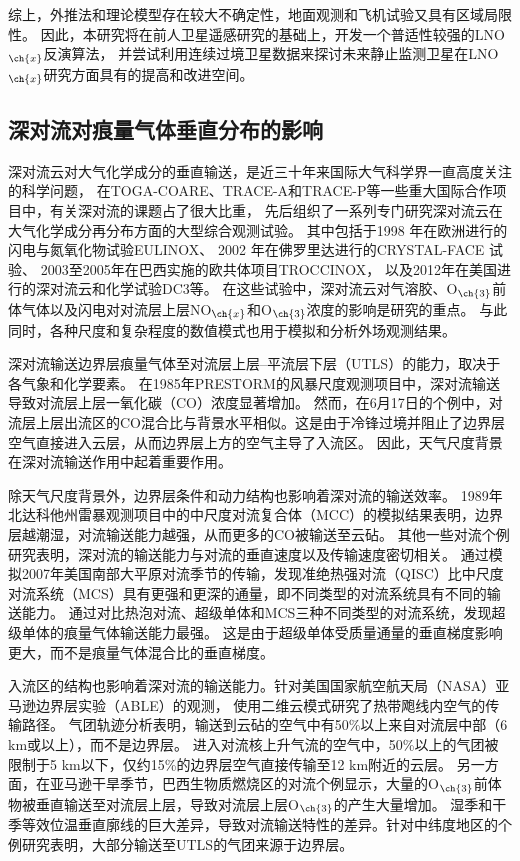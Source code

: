 综上，外推法和理论模型存在较大不确定性，地面观测和飞机试验又具有区域局限性。
因此，本研究将在前人卫星遥感研究的基础上，开发一个普适性较强的LNO$_{\ch{x}}$反演算法，
并尝试利用连续过境卫星数据来探讨未来静止监测卫星在LNO$_{\ch{x}}$研究方面具有的提高和改进空间。

\subsection{深对流对痕量气体垂直分布的影响}

深对流云对大气化学成分的垂直输送，是近三十年来国际大气科学界一直高度关注的科学问题，
在TOGA-COARE\citep{Webster.1992}、TRACE-A\citep{Fishman.1996}和TRACE-P\citep{Jacob.2003}等一些重大国际合作项目中，有关深对流的课题占了很大比重，
先后组织了一系列专门研究深对流云在大气化学成分再分布方面的大型综合观测试验。
其中包括于1998 年在欧洲进行的闪电与氮氧化物试验EULINOX\citep{Holler.2000}、
2002 年在佛罗里达进行的CRYSTAL-FACE 试验\citep{Toon.2003}、
2003至2005年在巴西实施的欧共体项目TROCCINOX\citep{Huntrieser.2008}，
以及2012年在美国进行的深对流云和化学试验DC3\citep{Barth.2019}等。
在这些试验中，深对流云对气溶胶、O$_{\ch{3}}$前体气体以及闪电对对流层上层NO$_{\ch{x}}$和O$_{\ch{3}}$浓度的影响是研究的重点。
与此同时，各种尺度和复杂程度的数值模式也用于模拟和分析外场观测结果。

深对流输送边界层痕量气体至对流层上层--平流层下层（UTLS）的能力，取决于各气象和化学要素。
在1985年PRESTORM的风暴尺度观测项目中，深对流输送导致对流层上层一氧化碳（CO）浓度显著增加\citep{Dickerson.1987,Pickering.1989}。
然而，在6月17日的个例中，对流层上层出流区的CO混合比与背景水平相似。这是由于冷锋过境并阻止了边界层空气直接进入云层，从而边界层上方的空气主导了入流区\citep{Pickering.1988}。
因此，天气尺度背景在深对流输送作用中起着重要作用。

除天气尺度背景外，边界层条件和动力结构也影响着深对流的输送效率。
1989年北达科他州雷暴观测项目中的中尺度对流复合体（MCC）的模拟结果表明，边界层越潮湿，对流输送能力越强，从而更多的CO被输送至云砧\citep{Stenchikov.1996}。
其他一些对流个例研究表明，深对流的输送能力与对流的垂直速度以及传输速度密切相关\citep{Pickering.1992a,Wang.1996}。
\citet{Bigelbach.2014}通过模拟2007年美国南部大平原对流季节的传输，发现准绝热强对流（QISC）比中尺度对流系统（MCS）具有更强和更深的通量，即不同类型的对流系统具有不同的输送能力。
\citet{Li.2017b}通过对比热泡对流、超级单体和MCS三种不同类型的对流系统，发现超级单体的痕量气体输送能力最强。
这是由于超级单体受质量通量的垂直梯度影响更大，而不是痕量气体混合比的垂直梯度。

入流区的结构也影响着深对流的输送能力。针对美国国家航空航天局（NASA）亚马逊边界层实验（ABLE）的观测，
\citet{Scala.1990}使用二维云模式研究了热带飑线内空气的传输路径。
气团轨迹分析表明，输送到云砧的空气中有50\%以上来自对流层中部（6 km或以上），而不是边界层。
进入对流核上升气流的空气中，50\%以上的气团被限制于5 km以下，仅约15\%的边界层空气直接传输至12 km附近的云层。
另一方面，在亚马逊干旱季节，巴西生物质燃烧区的对流个例显示，大量的O$_{\ch{3}}$前体物被垂直输送至对流层上层，导致对流层上层O$_{\ch{3}}$的产生大量增加\citep{Pickering.1992,Pickering.1992a,Pickering.1996}。
湿季和干季等效位温垂直廓线的巨大差异，导致对流输送特性的差异。针对中纬度地区的个例研究表明，大部分输送至UTLS的气团来源于边界层\citep{Mullendore.2005,Skamarock.2000}。

